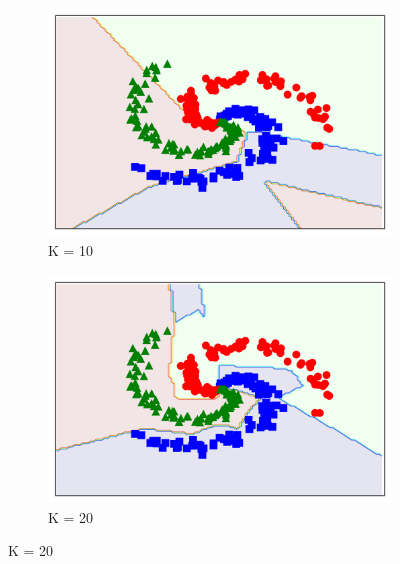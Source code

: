 \documentclass[12pt,letterpaper]{article}
\begin{document}
\begin{figure}
\captionsetup[subfigure]{labelformat=empty}
\centering
\begin{subfigure}{.5\textwidth}
  \centering
  \includegraphics[width=1\linewidth]{EX10.png}
  \caption{K = 10}
  \label{fig:sub1}
\end{subfigure}%
\begin{subfigure}{.5\textwidth}
  \centering
  \includegraphics[width=1\linewidth]{EX20.png}
  \caption{K = 20}
  \label{fig:sub2}
\end{subfigure}
\label{fig:test}
\end{figure}
\end{document}

